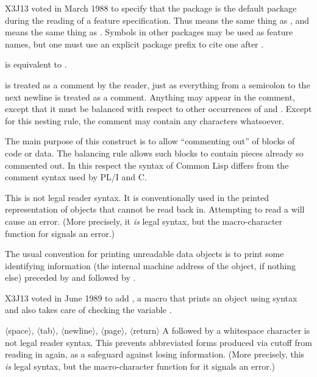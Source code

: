 \begin{flushdesc}
\begin{newer}
X3J13 voted in March 1988 
to specify that the  package is the default package during
the reading of a feature specification.  Thus  means the
same thing as , and
 means the same thing as .
Symbols in other packages
may be used as feature names, but one must use an explicit package prefix
to cite one after \cd{\#+}.
\end{newer}

\item[\cd{\#-}]
 is equivalent to .

\item[\cd{\#|}]
 is treated as a comment by the reader, just as everything
from a semicolon to the next newline is treated as a comment.
Anything may appear in the comment, except that it must be balanced
with respect to other occurrences of \cd{\#|} and \cd{|\#}.
Except for this nesting rule, the comment may contain any characters
whatsoever.

The main purpose of this construct is to allow ``commenting out''
of blocks of code or data.  The balancing rule allows such blocks
to contain pieces already so commented out.  In this respect
the  syntax of Common Lisp differs from the  comment syntax
used by {PL/I} and C.

\item[\cd{\#<}]
This is not legal reader syntax.
It is conventionally used in the printed representation of objects that cannot
be read back in.  Attempting to read a \cd{\#<} will cause an error.
(More precisely, it \emph{is} legal syntax, but the macro-character
function for \cd{\#<} signals an error.)

\begin{newer}
The usual convention for printing unreadable data objects is to print some identifying
information (the internal machine address of the object, if nothing else)
preceded by \cd{\#<} and followed by \cdf{>}.

X3J13 voted in June 1989  to add
, a macro that prints an object using 
syntax and also takes care of checking the variable .
\end{newer}

\item[\cd{\#}$\langle$space$\rangle$, \cd{ \#}$\langle$tab$\rangle$,
      \cd{ \#}$\langle$newline$\rangle$,
      \cd{ \#}$\langle$page$\rangle$, \cd{ \#}$\langle$return$\rangle$]
A \cd{\#} followed by a whitespace character is not legal reader syntax.
This prevents abbreviated forms produced via  cutoff
from reading in again, as a safeguard against losing
information.
(More precisely, this \emph{is} legal syntax, but the macro-character
function for it signals an error.)


\end{flushdesc}
